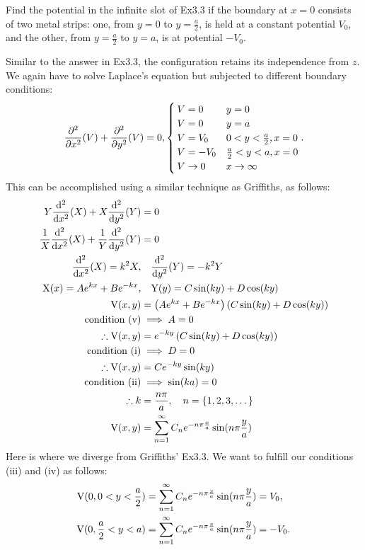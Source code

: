 \begin{hwkProblem}{3.13}{}
	
	Find the potential in the infinite slot of Ex3.3 if the boundary at \( x = 0 \) consists of two metal strips: one, from \( y = 0 \) to \( y = \frac{a}{2} \), is held at a constant potential \( V_{0} \), and the other, from \( y = \frac{a}{2} \) to \( y = a \), is at potential \( -V_{0} \).

	\hwkSol{}

	Similar to the answer in Ex3.3, the configuration retains its independence from \( z \). We again have to solve Laplace's equation but subjected to different boundary conditions:
	\[
		\frac{\partial^{2}}{\partial{}{x}^2} (V) + \frac{\partial^{2}}{\partial{}{y}^2} (V) = 0,
		\begin{cases}
			V = 0 & y = 0 \\
			V = 0 & y = a \\
			V = V_{0} & 0 < y < \frac{a}{2}, x = 0 \\
			V = -V_{0} & \frac{a}{2} < y < a, x = 0 \\
			V \to 0 & x \to \infty
		\end{cases}
	.\]
	This can be accomplished using a similar technique as Griffiths, as follows:
	\begin{align*}
		Y \derivsec{x}{X} + X \derivsec{y}{Y} &= 0 \\
		\frac{1}{X} \derivsec{x}{X} + \frac{1}{Y} \derivsec{y}{Y} &= 0 \\
		\derivsec{x}{X} = k^{2}X ,& \quad \derivsec{y}{Y} = -k^{2}Y \\
		\func{X}[x] = Ae^{kx}+Be^{-kx} ,& \quad \func{Y}[y] = C \sin{ky} + D \cos{ky} \\
		\func{V}[x, y] &= \left(Ae^{kx}+Be^{-kx}\right) \left(C \sin{ky} + D \cos{ky}\right) \\
		\text{condition (v)} &\implies A = 0 \\
		\therefore \func{V}[x, y] &= e^{-ky} \left(C \sin{ky} + D \cos{ky}\right) \\
		\text{condition (i)} &\implies D = 0 \\
		\therefore \func{V}[x, y] &= C e^{-ky} \sin{ky} \\
		\text{condition (ii)} &\implies \sin{ka} = 0 \\
		\therefore k &= \frac{n\pi}{a}, \quad n = \left\{1, 2, 3, \dots\right\} \\
		\func{V}[x, y] &= \sum_{n=1}^{\infty}C_{n}e^{-n \pi \frac{x}{a}} \sin{n \pi \frac{y}{a}}
	\end{align*}
	Here is where we diverge from Griffiths' Ex3.3. We want to fulfill our conditions (iii) and (iv) as follows:
	\begin{align*}
		\func{V}[0, 0<y<\frac{a}{2}] &= \sum_{n=1}^{\infty}C_{n}e^{-n \pi \frac{x}{a}} \sin{n \pi \frac{y}{a}} = V_{0}, \\
		\func{V}[0, \frac{a}{2}<y<a] &= \sum_{n=1}^{\infty}C_{n}e^{-n \pi \frac{x}{a}} \sin{n \pi \frac{y}{a}} = -V_{0}.
	\end{align*}

\end{hwkProblem}
